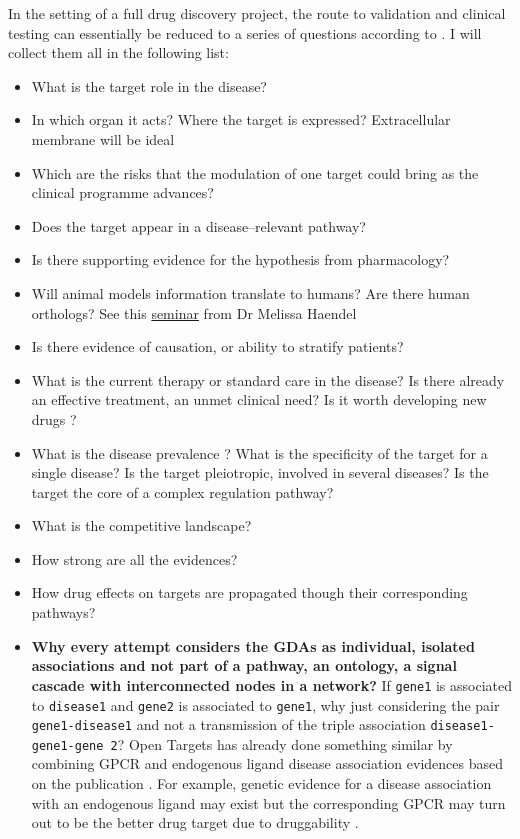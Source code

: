 In the setting of a full drug discovery project, the route to validation and clinical testing can essentially be reduced to a series of questions according to \cite{brown2018}. I will collect them all in the following list:
\begin{itemize}
    \item What is the target role in the disease?
    \item In which organ it acts? Where the target is expressed? Extracellular membrane will be ideal
    
    \item Which are the risks that the modulation of one target could bring as the clinical programme advances?
    
    \item Does the target appear in a disease--relevant pathway?
    
    \item Is there supporting evidence for the hypothesis from pharmacology?
    
    \item Will animal models information translate to humans? Are there human orthologs? See this \href{https://www.youtube.com/watch?v=BK04TZbO-HY}{seminar} from Dr Melissa Haendel
    
    \item Is there evidence of causation, or ability to stratify patients?
    
    \item What is the current therapy or standard care in the disease? Is there already an effective treatment, an unmet clinical need? Is it worth developing new drugs \cite{freudenberg2018, finan2017}? 
    
    \item What is the disease prevalence \cite{freudenberg2018}? What is the specificity of the target for a single disease? Is the target pleiotropic, involved in several diseases? Is the target the core of a complex regulation pathway?
    
    \item What is the competitive landscape?
    \item How strong are all the evidences?
    \item How drug effects on targets are propagated though their corresponding pathways?
    \item 
    \textbf{Why every attempt \cite{brown2018,DISEASES2015,DisGeNET2015,ctd2017} considers the GDAs as individual, isolated associations and not part of a pathway, an ontology, a signal cascade with interconnected nodes in a network?}
     If \texttt{gene1} is associated to \texttt{disease1} and \texttt{gene2} is associated to \texttt{gene1}, why just considering the pair \texttt{gene1-disease1} and not a transmission of the triple association \texttt{disease1-gene1-gene 2}? Open Targets has already done something similar by combining GPCR and endogenous ligand disease association evidences \cite{freudenberg2018} based on the publication \cite{southan2016}. For example, genetic evidence for a disease association with an endogenous ligand may exist but the corresponding GPCR may turn out to be the better drug target due to druggability \cite{freudenberg2018}.
    

\end{itemize}
